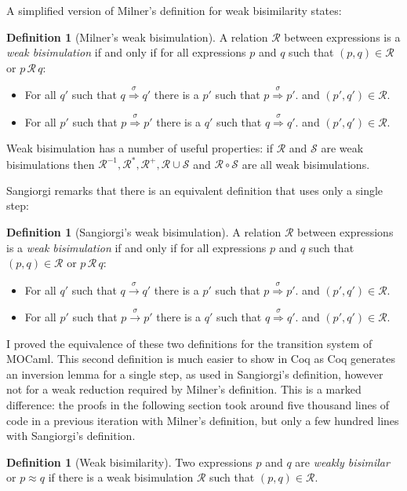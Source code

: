 \documentclass[12pt,twoside,notitlepage]{report}
\theoremstyle{plain}%
\theoremstyle{definition}
\newtheorem{defn}[thm]{Definition}
\theoremstyle{remark}
\begin{document}
A simplified version of Milner's definition for weak bisimilarity states:
\begin{defn}[Milner's weak bisimulation]
A relation $ \mathcal{R} $ between expressions is a \textit{weak bisimulation} if and only if for all expressions $ p $ and $ q $ such that $ (p,q)\in \mathcal{R} $ or $ p\, \mathcal{R}\, q $:
\begin{itemize}
\item{For all $ q' $ such that $ q \overset{\sigma}{\Rightarrow} q' $ there is a $ p' $ such that $ p \overset{\sigma}{\Rightarrow} p' $. and $ (p', q') \in \mathcal{R}$. }
\item{For all $ p' $ such that $ p \overset{\sigma}{\Rightarrow} p' $ there is a $ q' $ such that $ q \overset{\sigma}{\Rightarrow} q' $. and $ (p', q') \in \mathcal{R}$. }
\end{itemize}
\end{defn}

Weak bisimulation has a number of useful properties: if $ \mathcal{R} $ and $ \mathcal{S} $ are weak bisimulations then $ \mathcal{R}^{-1}, \mathcal{R}^*, \mathcal{R}^+, \mathcal{R}\cup\mathcal{S}$  and $\mathcal{R} \circ \mathcal{S} $ are all weak bisimulations.

Sangiorgi\cite{sangiorgi1992problem} remarks that there is an equivalent definition that uses only a single step:
\begin{defn}[Sangiorgi's weak bisimulation]
A relation $ \mathcal{R} $ between expressions is a \textit{weak bisimulation} if and only if for all expressions $ p $ and $ q $ such that $ (p,q)\in \mathcal{R} $ or $ p\, \mathcal{R}\, q $:
\begin{itemize}
\item{For all $ q' $ such that $ q \overset{\sigma}{\rightarrow} q' $ there is a $ p' $ such that $ p \overset{\sigma}{\Rightarrow} p' $. and $ (p', q') \in \mathcal{R}$. }
\item{For all $ p' $ such that $ p \overset{\sigma}{\rightarrow} p' $ there is a $ q' $ such that $ q \overset{\sigma}{\Rightarrow} q' $. and $ (p', q') \in \mathcal{R}$. }
\end{itemize}
\end{defn}

I proved the equivalence of these two definitions for the transition system of MOCaml. This second definition is much easier to show in Coq as Coq generates an inversion lemma for a single step, as used in Sangiorgi's definition, however not for a weak reduction required by Milner's definition. This is a marked difference: the proofs in the following section took around five thousand lines of code in a previous iteration with Milner's definition, but only a few hundred lines with Sangiorgi's definition.
\begin{defn}[Weak bisimilarity]
\label{defn:weak_bisimilarity}
Two expressions $ p $ and $ q $ are \textit{weakly bisimilar} or $ p\approx q $ if there is a weak bisimulation $ \mathcal{R} $ such that $ (p,q) \in \mathcal{R} $.
\end{defn}
\end{document}
